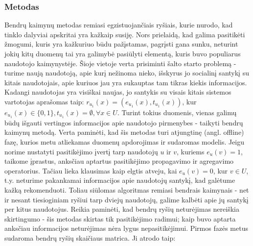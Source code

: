 \documentclass{VUMIFInfMagistrinis}
\begin{document}
\subsubsection{Metodas}
\indent
Bendrų kaimynų metodas remiasi egzistuojančiais ryšiais, kurie nurodo, kad tinklo dalyviai apskritai yra kažkaip susiję. Nors prielaidą, kad galima pasitikėti žmogumi, kuris yra kažkuriuo būdu pažįstamas, pagrįsti gana sunku, neturint jokių kitų duomenų tai yra galimybė pasiūlyti elementą, kuris buvo populiarus naudotojo kaimynystėje. 
\newline
\indent
Šioje vietoje verta prisiminti šalto starto problemą - turime naują naudotoją, apie kurį nežinoma nieko, išskyrus jo socialinį santykį su kitais naudotojais, apie kuriuos jau yra sukauptas tam tikras kiekis informacijos. Kadangi naudotojas yra visiškai naujas, jo santykis su visais kitais sistemos vartotojas aprašomas taip: $r_{u_1}(x) = (e_{u_1}(x), t_{u_1}(x))$, kur $e_{u_1}(x)\in \{0,1\}, t_{u_1}(x) = \emptyset, \forall x \in U$. Turint tokius duomenis, vienas galimų būdų išgauti vertingos informacijos apie naudotojo pirmenybes - taikyti bendrų kaimynų metodą. Verta paminėti, kad šis metodas turi atjungtinę (angl. offline) fazę, kurios metu atliekamas duomenų apdorojimas ir sudaromas modelis. 
\newline
\indent
Jeigu norime nustatyti pasitikėjimo įvertį tarp naudotojų $u$ ir $v$, kuriems $e_u(v)=1$, taikome įprastus, anksčiau aptartus pasitikėjimo propagavimo ir agregavimo operatorius. Tačiau lieka klausimas kaip elgtis atveju, kai $e_{u}(v)=0$, kur $v \in U$, t.y. neturime pakankamai informacijos apie naudotojų santykį, kad galėtume kažką rekomenduoti. Toliau siūlomas algoritmas remiasi bendrais kaimynais - net ir nesant tiesioginiam ryšiui tarp dviejų naudotojų, galime kalbėti apie jų santykį per kitus naudotojus. Reikia paminėti, kad bendrų ryšių neturėjimas nereiškia skirtingumo - šis metodas skirtas tik pasitikėjimo radimui; kaip buvo aptarta anksčiau informacijos neturėjimas nėra lygus nepasitikėjimui.
\newline
\indent
Pirmos fazės metus sudaroma bendrų ryšių skaičiaus matrica. Ji atrodo taip: 
\end{document}
